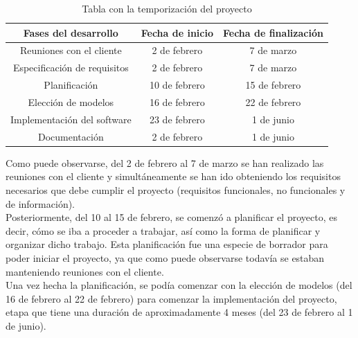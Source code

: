 \begin{table}[H]
        \centering
        \begin{tabular}{c c c } \hline
            \toprule
            \rowcolor{blue!50} 
            \textbf{Fases del desarrollo}   & \textbf{Fecha de inicio} & \textbf{Fecha de finalización} \\
            \midrule
            \rowcolor{blue!25} 
            Reuniones con el cliente        & 2 de febrero      & 7 de marzo    \\ 
            \rowcolor{blue!10} 
            Especificación de requisitos    & 2 de febrero      & 7 de marzo    \\ 
            \rowcolor{blue!25} 
            Planificación                   & 10 de febrero     & 15 de febrero \\ 
            \rowcolor{blue!10} 
            Elección de modelos             & 16 de febrero     & 22 de febrero \\ 
            \rowcolor{blue!25} 
            Implementación del software     & 23 de febrero     & 1 de junio    \\ 
            \rowcolor{blue!10} 
            Documentación                   & 2 de febrero      & 1 de junio    \\ \bottomrule
        \end{tabular}
        \label{tab:planning}
        \caption{Tabla con la temporización del proyecto}
\end{table}

Como puede observarse, del 2 de febrero al 7 de marzo se han realizado las reuniones con
el cliente y simultáneamente se han ido obteniendo los requisitos necesarios que debe cumplir
el proyecto (requisitos funcionales, no funcionales y de información).\\

Posteriormente, del 10 al 15 de febrero, se comenzó a planificar el proyecto, es
decir, cómo se iba a proceder a trabajar, así como la forma de planificar y organizar dicho
trabajo. Esta planificación fue una especie de borrador para poder iniciar el proyecto, ya
que como puede observarse todavía se estaban manteniendo reuniones con el cliente.\\

Una vez hecha la planificación, se podía comenzar con la elección de modelos (del 16 de
febrero al 22 de febrero) para comenzar la implementación del proyecto, etapa que
tiene una duración de aproximadamente 4 meses (del 23 de febrero al 1 de junio).\\

